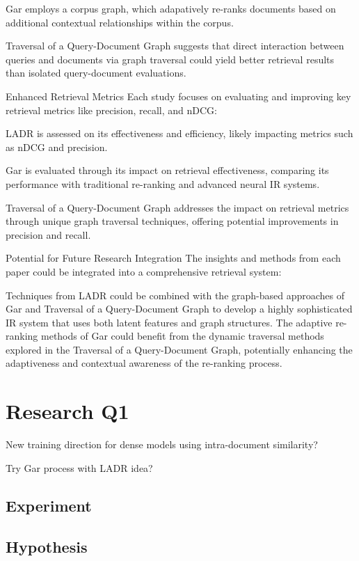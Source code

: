 \documentclass[sigconf,authorversion,nonacm]{acmart}
\begin{document}
Gar employs a corpus graph, which adapatively re-ranks documents based on additional
contextual relationships within the corpus.

Traversal of a Query-Document Graph suggests that direct interaction between queries and
documents via graph traversal could yield better retrieval results than isolated
query-document evaluations.

Enhanced Retrieval Metrics Each study focuses on evaluating and improving key retrieval
metrics like precision, recall, and nDCG:

LADR is assessed on its effectiveness and efficiency, likely impacting metrics such as nDCG
and precision.

Gar is evaluated through its impact on retrieval effectiveness, comparing its performance
with traditional re-ranking and advanced neural IR systems.

Traversal of a Query-Document Graph addresses the impact on retrieval metrics through unique
graph traversal techniques, offering potential improvements in precision and recall.

Potential for Future Research Integration The insights and methods from each paper could be
integrated into a comprehensive retrieval system:

Techniques from LADR could be combined with the graph-based approaches of Gar and Traversal
of a Query-Document Graph to develop a highly sophisticated IR system that uses both latent
features and graph structures. The adaptive re-ranking methods of Gar could benefit from the
dynamic traversal methods explored in the Traversal of a Query-Document Graph, potentially
enhancing the adaptiveness and contextual awareness of the re-ranking process.

\section{Research Q1}

New training direction for dense models using intra-document similarity?

Try Gar process with LADR idea?
\subsection{Experiment}

\subsection{Hypothesis}
\end{document}
